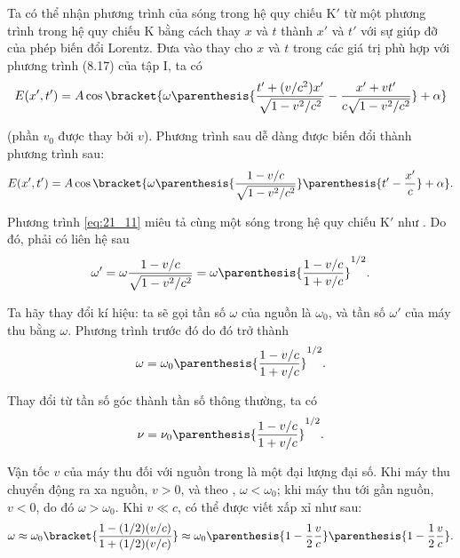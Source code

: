 Ta có thể nhận phương trình của sóng trong hệ quy chiếu K$'$ từ một phương trình trong hệ quy chiếu K bằng cách thay $x$ và $t$ thành $x'$ và $t'$ với sự giúp đỡ của phép biến đổi Lorentz.
Đưa vào thay cho $x$ và $t$ trong  các giá trị phù hợp với phương trình (8.17) của tập I, ta có
\begin{equation*}
	E(x',t') = A\cos\bracket{\omega \parenthesis{ \frac{t'+(v/c^2)x'}{\sqrt{1-v^2/c^2}} - \frac{x'+vt'}{c \sqrt{1-v^2/c^2}} } +\alpha }
\end{equation*}

\noindent
(phần $v_0$ được thay bởi $v$).
Phương trình sau dễ dàng được biến đổi thành phương trình sau:
\begin{equation}\label{eq:21_11}
	E(x',t') = A\cos\bracket{\omega \parenthesis{ \frac{1-v/c}{\sqrt{1-v^2/c^2}} } \parenthesis{t' - \frac{x'}{c}} +\alpha }.
\end{equation}

Phương trình \eqref{eq:21_11} miêu tả cùng một sóng trong hệ quy chiếu K$'$ như .
Do đó, phải có liên hệ sau
\begin{equation*}
	\omega' = \omega \frac{1-v/c}{\sqrt{1-v^2/c^2}} = \omega \parenthesis{\frac{1-v/c}{1+v/c}}^{1/2}.
\end{equation*}

\noindent
Ta hãy thay đổi kí hiệu: ta sẽ gọi tần số $\omega$ của nguồn là $\omega_0$, và tần số $\omega'$ của máy thu bằng $\omega$.
Phương trình trước đó do đó trở thành
\begin{equation}\label{eq:21_12}
	\omega = \omega_0 \parenthesis{\frac{1-v/c}{1+v/c}}^{1/2}.
\end{equation}

\noindent
Thay đổi từ tần số góc thành tần số thông thường, ta có
\begin{equation}\label{eq:21_13}
	\nu = \nu_0 \parenthesis{\frac{1-v/c}{1+v/c}}^{1/2}.
\end{equation}

Vận tốc $v$ của máy thu đối với nguồn trong  là một đại lượng đại số.
Khi máy thu chuyển động ra xa nguồn, $v > 0$, và theo , $\omega<\omega_0$; khi máy thu tới gần nguồn, $v<0$, do đó $\omega>\omega_0$.
Khi $v\ll c$,  có thể được viết xấp xỉ như sau:
\begin{equation*}
	\omega \approx \omega_0 \bracket{ \frac{1 -(1/2)(v/c)}{1 + (1/2)(v/c)} } \approx \omega_0 \parenthesis{1 - \frac{1}{2} \frac{v}{c}} \parenthesis{1 - \frac{1}{2} \frac{v}{c}}.
\end{equation*}

